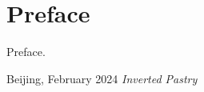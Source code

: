 \chapter{Preface}

Preface.

\begin{flushright}
    Beijing, February 2024 \hfill \emph{Inverted Pastry}
\end{flushright}
